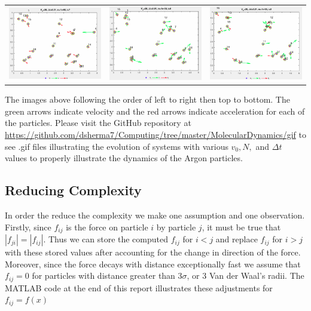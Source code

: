 \documentclass[11.5pt]{article}
\newcounter{graphics}
\begin{document}
\begin{center}
\begin{tabular}{ccc}
\includegraphics[width = 2in]{7.png}&\includegraphics[width = 2in]{8.png}&\includegraphics[width = 2in]{9.png}\\
\end{tabular}
\end{center}
The images above following the order of left to right then top to bottom. The green arrows indicate velocity and the red arrows indicate acceleration for each of the particles. Please visit the GitHub repository at \hyperlink{https://github.com/dsherma7/Computing/tree/master/MolecularDynamics/gif}{https://github.com/dsherma7/Computing/tree/master/MolecularDynamics/gif} to see .gif files illustrating the evolution of systems with various $v_0, N,$ and $\Delta t$ values to properly illustrate the dynamics of the Argon particles.

\subsection{Reducing Complexity}
In order the reduce the complexity we make one assumption and one observation. Firstly, since $f_{ij}$ is the force on particle $i$ by particle $j$, it must be true that $|f_{ji}| = |f_{ij}|$. Thus we can store the computed $f_{ij}$ for $i<j$ and replace $f_{ij}$ for $i > j$ with these stored values after accounting for the change in direction of the force.  Moreover, since the force decays with distance exceptionally fast we assume that $f_{ij} = 0$ for particles with distance greater than $3\sigma$, or 3 Van der Waal's radii. The MATLAB code at the end of this report illustrates these adjustments for $f_{ij}=f(x)$
\end{document}
